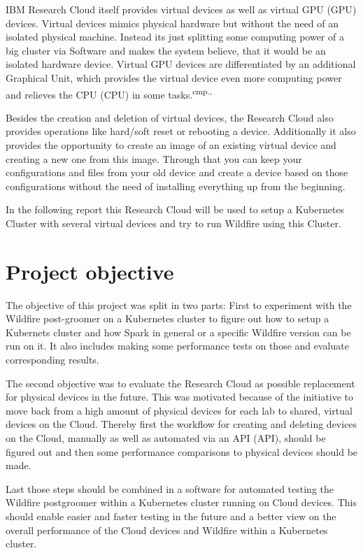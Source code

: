 
IBM Research Cloud itself provides virtual devices as well as virtual \acs{GPU} (\acl{GPU}) devices. Virtual devices mimics physical hardware but without the need of an isolated physical machine. Instead its just splitting some computing power of a big cluster via Software and makes the system believe, that it would be an isolated hardware device. Virtual GPU devices are differentiated by an additional Graphical Unit, which provides the virtual device even more computing power and relieves the \acs{CPU} (\acl{CPU}) in some tasks.\textsuperscript{cmp.\cite{10}, \cite{11}}


Besides the creation and deletion of virtual devices, the Research Cloud also provides operations like hard/soft reset or rebooting a device. Additionally it also provides the opportunity to create an image of an existing virtual device and creating a new one from this image. Through that you can keep your configurations and files from your old device and create a device based on those configurations without the need of installing everything up from the beginning.

In the following report this Research Cloud will be used to setup a Kubernetes Cluster with several virtual devices and try to run Wildfire using this Cluster.

\section{Project objective}

The objective of this project was split in two parts: First to experiment with the Wildfire post-groomer on a Kubernetes cluster to figure out how to setup a Kubernets cluster and how Spark in general or a specific Wildfire version can be run on it. It also includes making some performance tests on those and evaluate corresponding results. 

The second objective was to evaluate the Research Cloud as possible replacement for physical devices in the future. This was motivated because of the initiative to move back from a high amount of physical devices for each lab to shared, virtual devices on the Cloud. Thereby first the workflow for creating and deleting devices on the Cloud, manually as well as automated via an \acs{API} (\acl{API}), should be figured out and then some performance comparisons to physical devices should be made.

Last those steps should be combined in a software for automated testing the Wildfire postgroomer within a Kubernetes cluster running on Cloud devices. This should enable easier and faster testing in the future and a better view on the overall performance of the Cloud devices and Wildfire within a Kubernetes cluster.
